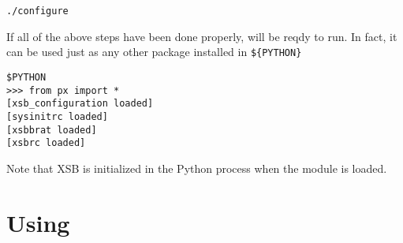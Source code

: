{\tt ./configure}

If all of the above steps have been done properly, \px{} will be
reqdy to run.  In fact, it can be used just as any other package
installed in {\tt \$\{PYTHON\}}

\begin{verbatim}
$PYTHON
>>> from px import *
[xsb_configuration loaded]
[sysinitrc loaded]
[xsbbrat loaded]
[xsbrc loaded]
\end{verbatim}

\noindent
Note that XSB is initialized in the Python process when the \px{}
module is loaded.




%
%

\section{Using \px}

